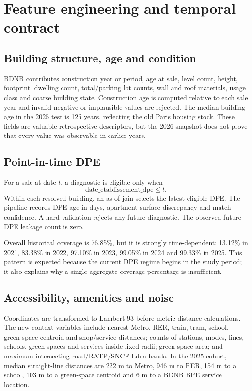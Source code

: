 \documentclass[11pt,a4paper]{article}
\begin{document}
\section{Feature engineering and temporal contract}

\subsection{Building structure, age and condition}

BDNB contributes construction year or period, age at sale, level count, height,
footprint, dwelling count, total/parking lot counts, wall and roof materials,
usage class and coarse building state. Construction age is computed relative
to each sale year and invalid negative or implausible values are rejected. The
median building age in the 2025 test is 125 years, reflecting the old Paris
housing stock. These fields are valuable retrospective descriptors, but the
2026 snapshot does not prove that every value was observable in earlier years.

\subsection{Point-in-time DPE}

For a sale at date $t$, a diagnostic is eligible only when
\begin{equation}
  \mathrm{date\_etablissement\_dpe} \leq t.
\end{equation}
Within each resolved building, an as-of join selects the latest eligible DPE.
The pipeline records DPE age in days, apartment-surface discrepancy and match
confidence. A hard validation rejects any future diagnostic. The observed
future-DPE leakage count is zero.

Overall historical coverage is 76.85\%, but it is strongly time-dependent:
13.12\% in 2021, 83.38\% in 2022, 97.10\% in 2023, 99.05\% in 2024 and 99.33\%
in 2025. This pattern is expected because the current DPE regime begins in the
study period; it also explains why a single aggregate coverage percentage is
insufficient.

\subsection{Accessibility, amenities and noise}

Coordinates are transformed to Lambert-93 before metric distance calculations.
The new context variables include nearest Metro, RER, train, tram, school,
green-space centroid and shop/service distances; counts of stations, modes,
lines, schools, green spaces and services inside fixed radii; green-space area;
and maximum intersecting road/RATP/SNCF Lden bands. In the 2025 cohort, median
straight-line distances are 222 m to Metro, 946 m to RER, 154 m to a school,
103 m to a green-space centroid and 6 m to a BDNB BPE service location.
\end{document}
